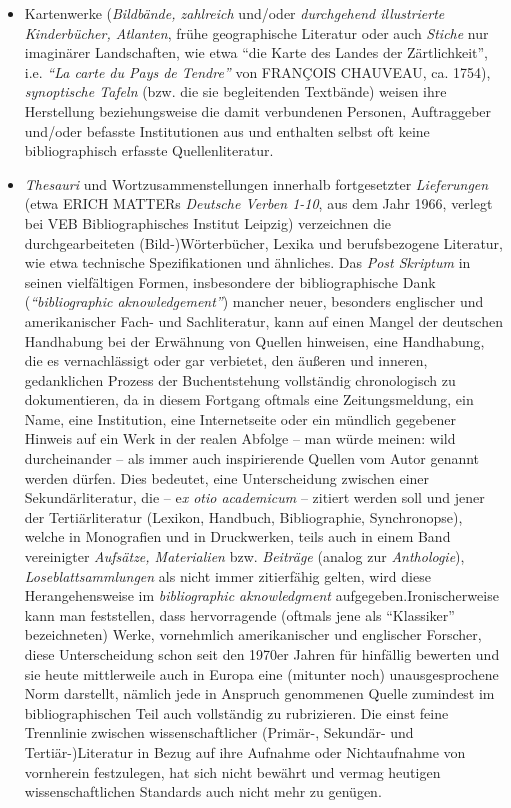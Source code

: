 \documentclass[a4paper,
fontsize=11pt,
oneside,
numbers=noperiodatend,
parskip=half-,
bibliography=totoc,
final
]{scrartcl}
\begin{document}
\begin{itemize}
\item
  Kartenwerke (\emph{Bildbände, zahlreich} und/oder \emph{durchgehend
  illustrierte Kinderbücher, Atlanten}, frühe geographische Literatur
  oder auch \emph{Stiche} nur imaginärer Landschaften, wie etwa
  \enquote{die Karte des Landes der Zärtlichkeit}, i.e.
  \emph{\enquote{La carte du Pays de Tendre}} von FRANÇOIS CHAUVEAU, ca.
  1754), \emph{synoptische Tafeln} (bzw. die sie begleitenden Textbände)
  weisen ihre Herstellung beziehungsweise die damit verbundenen
  Personen, Auftraggeber und/oder befasste Institutionen aus und
  enthalten selbst oft keine bibliographisch erfasste Quellenliteratur.
\item
  \emph{Thesauri} und Wortzusammenstellungen innerhalb fortgesetzter
  \emph{Lieferungen} (etwa ERICH MATTERs \emph{Deutsche Verben 1-10},
  aus dem Jahr 1966, verlegt bei VEB Bibliographisches Institut Leipzig)
  verzeichnen die durchgearbeiteten (Bild-)Wörterbücher, Lexika und
  berufsbezogene Literatur, wie etwa technische Spezifikationen und
  ähnliches. Das \emph{Post Skriptum} in seinen vielfältigen Formen,
  insbesondere der bibliographische Dank (\emph{\enquote{bibliographic
  aknowledgement}}) mancher neuer, besonders englischer und
  amerikanischer Fach- und Sachliteratur, kann auf einen Mangel der
  deutschen Handhabung bei der Erwähnung von Quellen hinweisen, eine
  Handhabung, die es vernachlässigt oder gar verbietet, den äußeren und
  inneren, gedanklichen Prozess der Buchentstehung vollständig
  chronologisch zu dokumentieren, da in diesem Fortgang oftmals eine
  Zeitungsmeldung, ein Name, eine Institution, eine Internetseite oder
  ein mündlich gegebener Hinweis auf ein Werk in der realen Abfolge --
  man würde meinen: wild durcheinander -- als immer auch inspirierende
  Quellen vom Autor genannt werden dürfen. Dies bedeutet, eine
  Unterscheidung zwischen einer Sekundärliteratur, die -- e\emph{x otio
  academicum} -- zitiert werden soll und jener der Tertiärliteratur
  (Lexikon, Handbuch, Bibliographie, Synchronopse), welche in
  Monografien und in Druckwerken, teils auch in einem Band vereinigter
  \emph{Aufsätze, Materialien} bzw. \emph{Beiträge} (analog zur
  \emph{Anthologie}), \emph{Loseblattsammlungen} als nicht immer
  zitierfähig gelten, wird diese Herangehensweise im \emph{bibliographic
  aknowledgment} aufgegeben.Ironischerweise kann man feststellen, dass
  hervorragende (oftmals jene als \enquote{Klassiker} bezeichneten)
  Werke, vornehmlich amerikanischer und englischer Forscher, diese
  Unterscheidung schon seit den 1970er Jahren für hinfällig bewerten und
  sie heute mittlerweile auch in Europa eine (mitunter noch)
  unausgesprochene Norm darstellt, nämlich jede in Anspruch genommenen
  Quelle zumindest im bibliographischen Teil auch vollständig zu
  rubrizieren. Die einst feine Trennlinie zwischen wissenschaftlicher
  (Primär-, Sekundär- und Tertiär-)Literatur in Bezug auf ihre Aufnahme
  oder Nichtaufnahme von vornherein festzulegen, hat sich nicht bewährt
  und vermag heutigen wissenschaftlichen Standards auch nicht mehr zu
  genügen.
\end{itemize}
\end{document}
